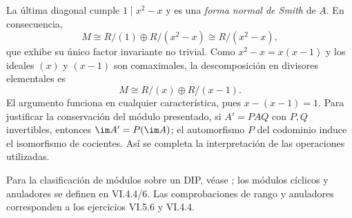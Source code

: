 La última diagonal cumple $1\mid x^2-x$ y es una \emph{forma normal de Smith} de $A$. En consecuencia,
\[
M\cong R/(1)\oplus R/(x^2-x)\cong R/(x^2-x),
\]
que exhibe su único factor invariante no trivial. Como $x^2-x=x(x-1)$ y los ideales $(x)$ y $(x-1)$ son comaximales, la descomposición en divisores elementales es
\[
M\cong R/(x)\oplus R/(x-1).
\]
El argumento funciona en cualquier característica, pues $x-(x-1)=1$. Para justificar la conservación del módulo presentado, si $A'=PAQ$ con $P,Q$ invertibles, entonces $\im A'=P(\im A)$; el automorfismo $P$ del codominio induce el isomorfismo de cocientes. Así se completa la interpretación de las operaciones utilizadas.

\begin{obs}
Para la clasificación de módulos sobre un DIP, véase \citet[cap.~VI, 5.1--7]{aluffi2009}; los módulos cíclicos y anuladores se definen en VI.4.4/6. Las comprobaciones de rango y anuladores corresponden a los ejercicios VI.5.6 y VI.4.4.
\end{obs}
